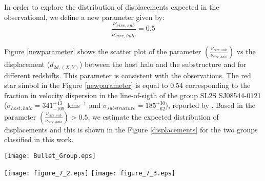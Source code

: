 \documentclass[12pt,preprint]{aastex}
\begin{document}
In order to explore the distribution of displacements expected in the observational, we define a new parameter given by:\\

\begin{equation}
 \frac{\nu_{circ,sub}}{\nu_{circ,halo}}=0.5
\end{equation}
 

Figure \ref{newparameter} shows the scatter plot of the parameter $\left(\frac{\nu_{circ,sub}}{\nu_{circ,halo}}\right)$ vs the 
displacement ($d_{2d,(X,Y)}$) between the host halo and the substructure and for different redshifts. This parameter is 
consistent with the observations. The red star simbol in the Figure \ref{newparameter} is equal to 0.54 corresponding to 
the fraction in velocity dispersion in the line-of-sigth of the group SL2S SJ08544-0121 ($\sigma_{host,halo}=341^{+43}_{-109}$ kms$^{-1}$ and $\sigma_{substructure}=185^{+30}_{-62}$), reported by \citet{2013A&A...552A..80M}.
Based in the parameter $\left(\frac{\nu_{circ,sub}}{\nu_{circ,halo}}\right)>0.5$, we estimate the expected distribution of
displacements and this is shown in the Figure \ref{displacements} for the two groups classified in this work.
 
  
\begin{figure*}
\begin{center}
\texttt{[image: Bullet\_Group.eps]}
\end{center}
\caption{Configuration for a host halo (dashed circle) and sub-structure (black circle) in the sample. } 
\label{configuration}
\end{figure*}


\begin{figure*}
\begin{center}
\texttt{[image: figure\_7\_2.eps]}
\texttt{[image: figure\_7\_3.eps]}
\end{center}
\caption{Scatter $\left(\frac{\nu_{circ,sub}}{\nu_{circ,halo}}\right)$ vs $d_{2d,(X,Y)}$ for different redshifts. The 
horizontal dashed line correpond to $\left(\frac{\nu_{circ,sub}}{\nu_{circ,halo}}\right)=0.5$ and the red star simbol correspond
to $\left(\frac{\nu_{circ,sub}}{\nu_{circ,halo}}\right)=0.54$ for SL2S SJ08544-0121 in \citet{2013A&A...552A..80M}. The 
four top panels are the sample with circular velocities $>700$ kms$^{-1}$ and the four down panels are the sample with 
circular velocities between 300 km s$^{-1}$ to 700 kms$^{-1}$.}
\label{newparameter}
\end{figure*}
\end{document}
